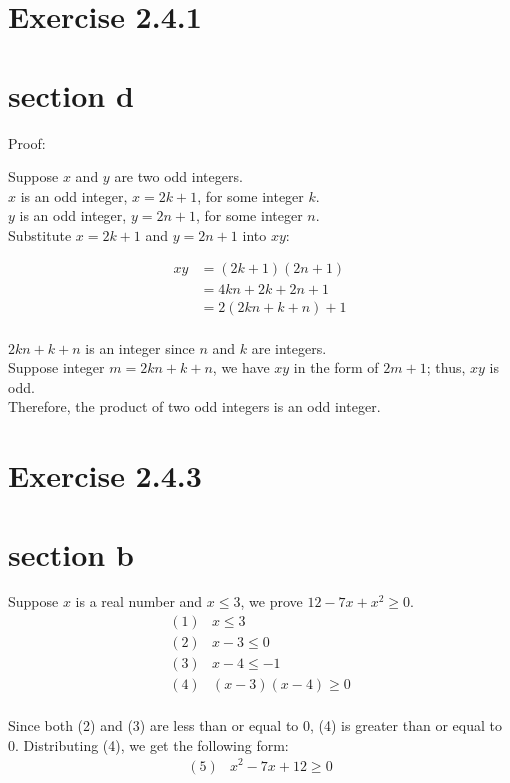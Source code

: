 \documentclass[10pt]{article}
\begin{document}
\section*{Exercise 2.4.1}
\section*{section d}
Proof:

Suppose $x$ and $y$ are two odd integers.\\
$x$ is an odd integer, $x=2 k+1$, for some integer $k$.\\
$y$ is an odd integer, $y=2 n+1$, for some integer $n$.\\
Substitute $x=2k+1$ and $y=2n+1$ into $x y$:

$$
\begin{aligned}
x y & =(2 k+1)(2 n+1) \\
& =4 k n+2 k+2 n+1 \\
& =2(2 k n+k+n)+1 \\
\end{aligned}
$$

$2 k n+k+n$ is an integer since $n$ and $k$ are integers.\\
Suppose integer $m=2 k n+k+n$, we have $x y$ in the form of $2 m+1$; thus, $x y$ is odd.\\
Therefore, the product of two odd integers is an odd integer.

\section*{Exercise 2.4.3}
\section*{section b}

Suppose $x$ is a real number and $x \leq 3$, we prove $12-7 x+x^{2} \geq 0$.\\

$$
\begin{array}{rr}
(1) & x \leq 3 \\
(2) & x-3 \leq 0 \\
(3) & x-4 \leq-1 \\
(4) & (x-3)(x-4) \geq 0 \\
\end{array}
$$

Since both (2) and (3) are less than or equal to 0, (4) is greater than or equal to 0. Distributing (4), we get the following form:
$$
\begin{array}{rr}
(5) & x^{2}-7 x+12 \geq 0 \\
\end{array}
$$
\end{document}
